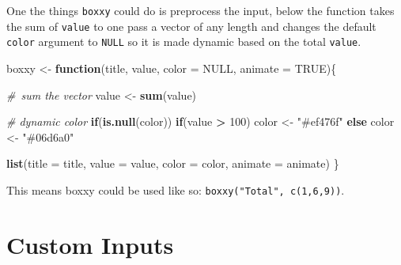 \documentclass[
]{krantz}
\makeatletter
\newenvironment{Shaded}{\begin{snugshade}}{\end{snugshade}}
\newcommand{\CommentTok}[1]{\textcolor[rgb]{0.37,0.37,0.37}{\textit{#1}}}
\newcommand{\ControlFlowTok}[1]{\textcolor[rgb]{0.27,0.27,0.27}{\textbf{#1}}}
\newcommand{\DataTypeTok}[1]{\textcolor[rgb]{0.27,0.27,0.27}{#1}}
\newcommand{\DecValTok}[1]{\textcolor[rgb]{0.06,0.06,0.06}{#1}}
\newcommand{\KeywordTok}[1]{\textcolor[rgb]{0.27,0.27,0.27}{\textbf{#1}}}
\newcommand{\NormalTok}[1]{#1}
\newcommand{\OperatorTok}[1]{\textcolor[rgb]{0.43,0.43,0.43}{\textbf{#1}}}
\newcommand{\OtherTok}[1]{\textcolor[rgb]{0.37,0.37,0.37}{#1}}
\newcommand{\StringTok}[1]{\textcolor[rgb]{0.5,0.5,0.5}{#1}}
\newenvironment{kframe}{%
\medskip{}
\setlength{\fboxsep}{.8em}
 \def\at@end@of@kframe{}%
 \ifinner\ifhmode%
  \def\at@end@of@kframe{\end{minipage}}%
  \begin{minipage}{\columnwidth}%
 \fi\fi%
 \def\FrameCommand##1{\hskip\@totalleftmargin \hskip-\fboxsep
 \colorbox{shadecolor}{##1}\hskip-\fboxsep
     \hskip-\linewidth \hskip-\@totalleftmargin \hskip\columnwidth}%
 \MakeFramed {\advance\hsize-\width
   \@totalleftmargin\z@ \linewidth\hsize
   \@setminipage}}%
 {\par\unskip\endMakeFramed%
 \at@end@of@kframe}
\renewenvironment{Shaded}{\begin{kframe}}{\end{kframe}}
\makeatother
\begin{document}
\begin{Shaded}
\end{Shaded}

One the things \texttt{boxxy} could do is preprocess the input, below the function takes the sum of \texttt{value} to one pass a vector of any length and changes the default \texttt{color} argument to \texttt{NULL} so it is made dynamic based on the total \texttt{value}.

\begin{Shaded}
\begin{Highlighting}[]
\NormalTok{boxxy <{-}}\StringTok{ }\ControlFlowTok{function}\NormalTok{(title, value, }\DataTypeTok{color =} \OtherTok{NULL}\NormalTok{, }\DataTypeTok{animate =} \OtherTok{TRUE}\NormalTok{)\{}

  \CommentTok{\# sum the vector}
\NormalTok{  value <{-}}\StringTok{ }\KeywordTok{sum}\NormalTok{(value)}

  \CommentTok{\# dynamic color}
  \ControlFlowTok{if}\NormalTok{(}\KeywordTok{is.null}\NormalTok{(color))}
    \ControlFlowTok{if}\NormalTok{(value }\OperatorTok{>}\StringTok{ }\DecValTok{100}\NormalTok{)}
\NormalTok{      color <{-}}\StringTok{ "\#ef476f"}
    \ControlFlowTok{else}
\NormalTok{      color <{-}}\StringTok{ "\#06d6a0"}

  \KeywordTok{list}\NormalTok{(}\DataTypeTok{title =}\NormalTok{ title, }\DataTypeTok{value =}\NormalTok{ value, }\DataTypeTok{color =}\NormalTok{ color, }\DataTypeTok{animate =}\NormalTok{ animate)}
\NormalTok{\}}
\end{Highlighting}
\end{Shaded}

This means boxxy could be used like so: \texttt{boxxy("Total",\ c(1,6,9))}.

\hypertarget{shiny-input}{%
\chapter{Custom Inputs}\label{shiny-input}}
\end{document}
